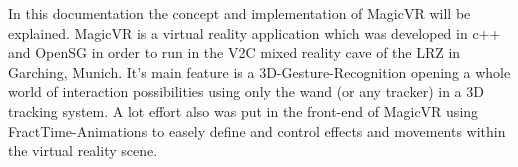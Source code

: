 In this documentation the concept and implementation of MagicVR will be explained. MagicVR is a virtual reality application which was developed in c++ and OpenSG in order to run in the V2C mixed reality cave of the LRZ in Garching, Munich. It\rq{}s main feature is a 3D-Gesture-Recognition opening a whole world of interaction possibilities using only the wand (or any tracker) in a 3D tracking system. A lot effort also was put in the front-end of MagicVR using FractTime-Animations to easely define and control effects and movements within the virtual reality scene.